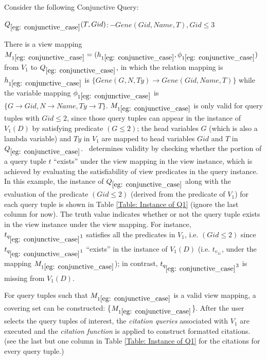 \begin{example}\label{eg: conjunctive_case}
Consider the following Conjunctive Query:
\begin{tabbing}
$Q_{\ref{eg: conjunctive_case}}(T, Gid) $\hspace{0.05em}$:- Gene(Gid, Name, T), Gid \leq 3$
\end{tabbing}
There is a view mapping $M_{1\ref{eg: conjunctive_case}} = (h_{1\ref{eg: conjunctive_case}}, \phi_{1\ref{eg: conjunctive_case}})$ from $V_1$ to $Q_{\ref{eg: conjunctive_case}}$, in which the relation mapping is $h_{1\ref{eg: conjunctive_case}}$ is $\{Gene(G, N, Ty) \rightarrow Gene(Gid, Name, T)\}$ while the variable mapping $\phi_{1\ref{eg: conjunctive_case}}$ is \\$\{G\rightarrow Gid, N \rightarrow Name, Ty\rightarrow T\}$. $M_{1\ref{eg: conjunctive_case}}$ is only valid for query tuples with $Gid \leq 2$, since those query tuples can appear in the instance of  $V_1(D)$ by satisfying predicate $(G \leq 2)$; the head variables $G$ (which is also a lambda variable) and $Ty$ in $V_1$ are mapped to head variables $Gid$ and $T$ in $Q_{\ref{eg: conjunctive_case}}$. \rba\ determines validity by checking whether the portion of a query tuple $t$ ``exists'' under the view mapping in the view instance, which is achieved by evaluating the satisfiability of view predicates in the query instance. In this example, the instance of $Q_{\ref{eg: conjunctive_case}}$ along with the evaluation of the predicate $(Gid \leq 2)$ (derived from the predicate of $V_1$) for each query tuple is shown in Table \ref{Table: Instance of Q1} (ignore the last column for now). The truth value indicates whether or not the query tuple exists in the view instance under the view mapping. For instance, $t_{q_{\ref{eg: conjunctive_case}}1}$ satisfies all the predicates in $V_1$, i.e. $(Gid \leq 2)$ since $t_{q_{\ref{eg: conjunctive_case}}1}$ ``exists'' in the instance of $V_1(D)$ (i.e. $t_{v_11}$, under the mapping $M_{1\ref{eg: conjunctive_case}}$); in contrast, $t_{q_{\ref{eg: conjunctive_case}}3}$ is missing from $V_1(D)$.

For query tuples such that $M_{1\ref{eg: conjunctive_case}}$ is a valid view mapping, a covering set can be constructed:  \{$M_{1\ref{eg: conjunctive_case}}$\}. After the user selects the query tuples of interest, the \textit{citation queries} associated with $V_1$ are executed and the {\em citation function} is applied to construct formatted citations. 
(see the last but one column in Table \ref{Table: Instance of Q1} for the citations for every query tuple.)
\end{example}
